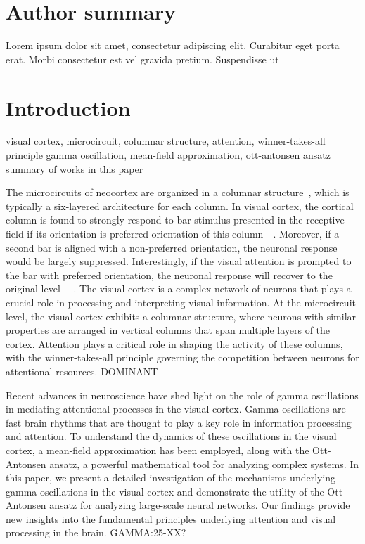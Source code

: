 \documentclass[10pt,letterpaper]{article}
\begin{document}
\section*{Author summary}
Lorem ipsum dolor sit amet, consectetur adipiscing elit. Curabitur eget porta erat. Morbi consectetur est vel gravida pretium. Suspendisse ut

\linenumbers

\section*{Introduction}
visual cortex, microcircuit, columnar structure, attention, winner-takes-all principle
gamma oscillation, mean-field approximation, ott-antonsen ansatz
summary of works in this paper

The microcircuits of neocortex are organized in a columnar structure~\cite{Mountcastle1957}, which is typically a six-layered architecture for each column. In visual cortex, the cortical column is found to strongly respond to bar stimulus presented in the receptive field if its orientation is preferred orientation of this column~\cite{hubel1959}~\cite{reynolds1999}. Moreover, if a second bar is aligned with a non-preferred orientation, the neuronal response would be largely suppressed. Interestingly, if the visual attention is prompted to the bar with preferred orientation, the neuronal response will recover to the original level ~\cite{reynolds1999}~\cite{luck1997}.  
The visual cortex is a complex network of neurons that plays a crucial role in processing and interpreting visual information. At the microcircuit level, the visual cortex exhibits a columnar structure, where neurons with similar properties are arranged in vertical columns that span multiple layers of the cortex. Attention plays a critical role in shaping the activity of these columns, with the winner-takes-all principle governing the competition between neurons for attentional resources. DOMINANT

Recent advances in neuroscience have shed light on the role of gamma oscillations in mediating attentional processes in the visual cortex. Gamma oscillations are fast brain rhythms that are thought to play a key role in information processing and attention. To understand the dynamics of these oscillations in the visual cortex, a mean-field approximation has been employed, along with the Ott-Antonsen ansatz, a powerful mathematical tool for analyzing complex systems. In this paper, we present a detailed investigation of the mechanisms underlying gamma oscillations in the visual cortex and demonstrate the utility of the Ott-Antonsen ansatz for analyzing large-scale neural networks. Our findings provide new insights into the fundamental principles underlying attention and visual processing in the brain. GAMMA:25-XX?
\end{document}
